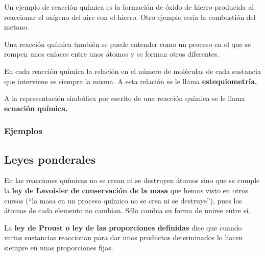 \documentclass[
  spanish,
]{article}
\begin{document}
\hfill{}

Un ejemplo de reacción química es la formación de óxido de hierro
producida al reaccionar el oxígeno del aire con el hierro. Otro ejemplo
sería la combustión del metano.

Una reacción química también se puede entender como un proceso en el que
se rompen unos enlaces entre unos átomos y se forman otros diferentes.

En cada reacción química la relación en el número de moléculas de cada
sustancia que interviene es siempre la misma. A esta relación se le
llama \textbf{estequiometría.}

A la representación simbólica por escrito de una reacción química se le
llama \textbf{ecuación química.}

\hypertarget{ejemplos}{%
\subsubsection{Ejemplos}\label{ejemplos}}




\hypertarget{leyes-ponderales}{%
\subsection{Leyes ponderales}\label{leyes-ponderales}}

En las reacciones químicas no se crean ni se destruyen átomos sino que
se cumple la \textbf{ley de Lavoisier de conservación de la masa} que
hemos visto en otros cursos (``la masa en un proceso químico no se crea
ni se destruye''), pues los átomos de cada elemento no cambian. Sólo
cambia su forma de unirse entre sí.

La \textbf{ley de Proust o ley de las proporciones definidas} dice que
cuando varias sustancias reaccionan para dar unos productos determinados
lo hacen siempre en unas proporciones fijas.
\end{document}
